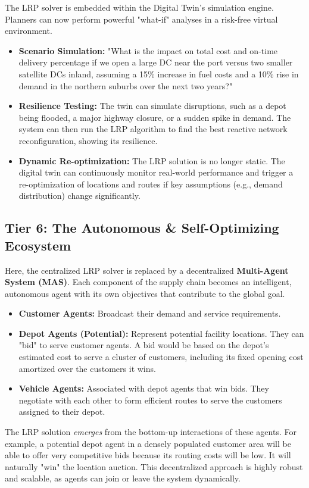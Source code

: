 \documentclass{article}
\begin{document}
The LRP solver is embedded within the Digital Twin's simulation engine. Planners can now perform powerful "what-if" analyses in a risk-free virtual environment.
\begin{itemize}
    \item \textbf{Scenario Simulation:} "What is the impact on total cost and on-time delivery percentage if we open a large DC near the port versus two smaller satellite DCs inland, assuming a 15\% increase in fuel costs and a 10\% rise in demand in the northern suburbs over the next two years?"
    \item \textbf{Resilience Testing:} The twin can simulate disruptions, such as a depot being flooded, a major highway closure, or a sudden spike in demand. The system can then run the LRP algorithm to find the best reactive network reconfiguration, showing its resilience.
    \item \textbf{Dynamic Re-optimization:} The LRP solution is no longer static. The digital twin can continuously monitor real-world performance and trigger a re-optimization of locations and routes if key assumptions (e.g., demand distribution) change significantly.
\end{itemize}

\subsection{Tier 6: The Autonomous \& Self-Optimizing Ecosystem}
Here, the centralized LRP solver is replaced by a decentralized \textbf{Multi-Agent System (MAS)}. Each component of the supply chain becomes an intelligent, autonomous agent with its own objectives that contribute to the global goal.
\begin{itemize}
    \item \textbf{Customer Agents:} Broadcast their demand and service requirements.
    \item \textbf{Depot Agents (Potential):} Represent potential facility locations. They can "bid" to serve customer agents. A bid would be based on the depot's estimated cost to serve a cluster of customers, including its fixed opening cost amortized over the customers it wins.
    \item \textbf{Vehicle Agents:} Associated with depot agents that win bids. They negotiate with each other to form efficient routes to serve the customers assigned to their depot.
\end{itemize}
The LRP solution \textit{emerges} from the bottom-up interactions of these agents. For example, a potential depot agent in a densely populated customer area will be able to offer very competitive bids because its routing costs will be low. It will naturally "win" the location auction. This decentralized approach is highly robust and scalable, as agents can join or leave the system dynamically.
\end{document}
